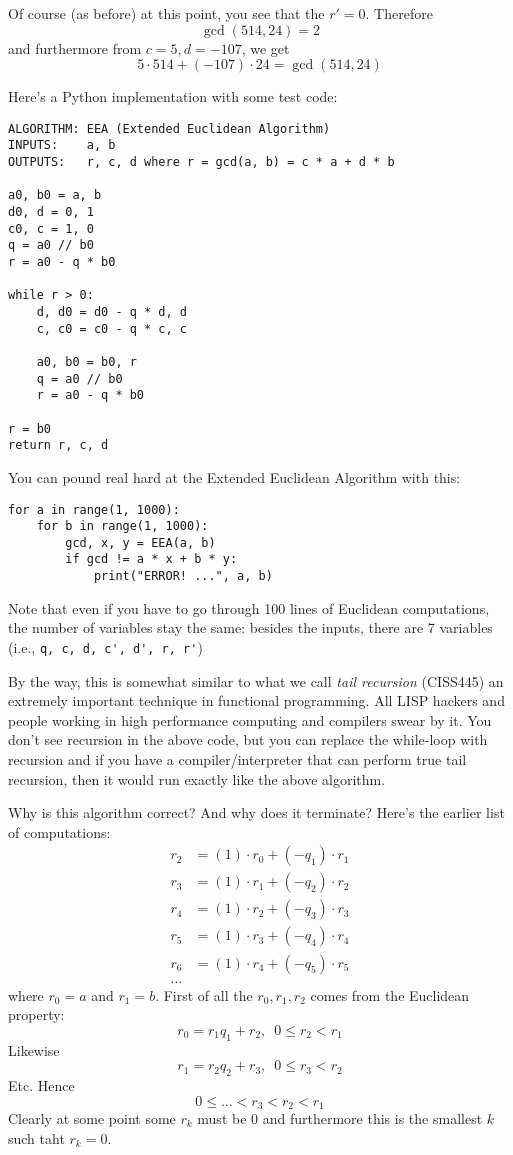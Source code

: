 Of course (as before) at this point, you see that the $r'=0$.
Therefore 
\[
\gcd(514, 24) = 2
\]
and furthermore from $c=5, d=-107$, we get
\[
5 \cdot 514 + (-107) \cdot 24 = \gcd(514, 24) 
\]

Here's a Python implementation with some test code:
\begin{Verbatim}[frame=single, fontsize=\footnotesize]
ALGORITHM: EEA (Extended Euclidean Algorithm)
INPUTS:    a, b
OUTPUTS:   r, c, d where r = gcd(a, b) = c * a + d * b

a0, b0 = a, b
d0, d = 0, 1
c0, c = 1, 0
q = a0 // b0
r = a0 - q * b0

while r > 0:
    d, d0 = d0 - q * d, d    
    c, c0 = c0 - q * c, c

    a0, b0 = b0, r
    q = a0 // b0
    r = a0 - q * b0

r = b0
return r, c, d
\end{Verbatim}
You can pound real hard at the Extended Euclidean Algorithm with this:
\begin{Verbatim}[frame=single,fontsize=\footnotesize]
for a in range(1, 1000):
    for b in range(1, 1000):
        gcd, x, y = EEA(a, b)
        if gcd != a * x + b * y:
            print("ERROR! ...", a, b)
\end{Verbatim}

Note that even if you have to go through 100 lines of 
Euclidean computations, the number of variables stay the same:
besides the inputs, there are 7 variables (i.e., \verb!q, c, d, c', d', r, r'!)

By the way, this is somewhat similar to what we call
\textit{tail recursion} (CISS445)
an extremely important technique in functional programming.
All LISP hackers and people working in high performance computing
and compilers swear by it.
You don't see recursion in the above code, but you can 
replace the while-loop with recursion and if
you have a compiler/interpreter that can perform 
true tail recursion, then it would run exactly like the above algorithm.


Why is this algorithm correct?
And why does it terminate?
Here's the earlier list of computations:
\begin{align*}
r_2 &= (1) \cdot r_0 + (-q_1) \cdot r_1  \\
r_3 &= (1) \cdot r_1 + (-q_2) \cdot r_2  \\
r_4 &= (1) \cdot r_2 + (-q_3) \cdot r_3  \\
r_5 &= (1) \cdot r_3 + (-q_4) \cdot r_4  \\
r_6 &= (1) \cdot r_4 + (-q_5) \cdot r_5  \\
...
\end{align*}
where $r_0 = a$ and $r_1 = b$.
First of all the $r_0, r_1, r_2$ comes from the Euclidean property:
\[
r_0 = r_1q_1 + r_2, \,\,\, 0 \leq r_2 < r_1
\]
Likewise
\[
r_1 = r_2q_2 + r_3, \,\,\, 0 \leq r_3 < r_2
\]
Etc.
Hence
\[
0 \leq \ldots < r_3 < r_2 < r_1
\]
Clearly at some point some $r_k$ must be $0$ and furthermore
this is the smallest $k$ such taht $r_k = 0$.

